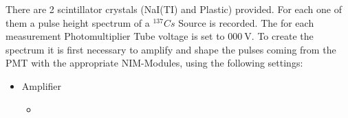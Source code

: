 \documentclass[12pt,twoside,a4paper]{scrartcl}
\begin{document}
	There are 2 scintillator crystals (NaI(TI) and Plastic) provided. For each one of them a pulse height spectrum of a $^{137}Cs$ Source is recorded. The for each measurement Photomultiplier Tube voltage is set to $\SI{000}{\volt}$. To create the spectrum it is first necessary to amplify and shape the pulses coming from the PMT with the appropriate NIM-Modules, using the following settings:

	\begin{itemize}
		\item Amplifier
			\begin{itemize}
				\item
			\end{itemize}
	\end{itemize}
\end{document}
